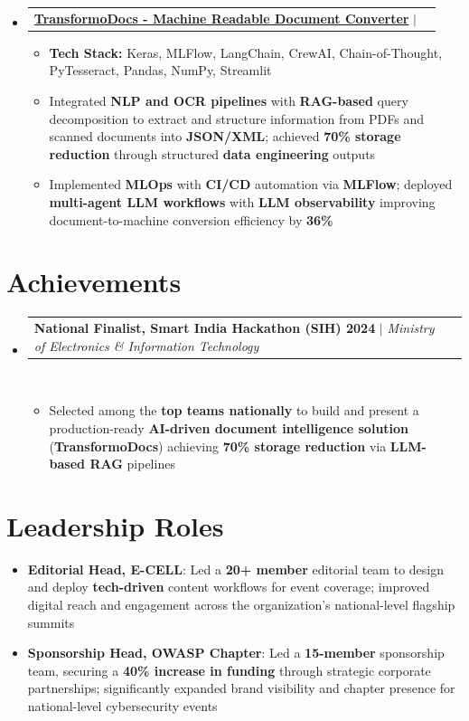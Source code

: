 \documentclass[a4paper, 11pt]{article}
\makeatletter
\newcommand{\resumeItem}[2]{
  \item\small{
    \textbf{#1}{: #2 \vspace{-4pt}}
  }
}
\newcommand{\resumeItemWithoutTitle}[1]{
  \item\small{
    {#1 \vspace{-2pt}}
      {\vspace{-2pt}}
  }
}
\newcommand{\resumeSubheadingPro}[2]{
  \vspace{-2pt}\item
  \begin{tabular*}{0.97\textwidth}{l@{\extracolsep{\fill}}r}
    #1 & {\textit {\small{#2}}} \\
  \end{tabular*}\vspace{-7pt}
}
\newcommand{\resumeSubItem}[2]{\resumeItem{#1}{#2}\vspace{-5pt}}
\newcommand{\resumeSubHeadingListStart}{\begin{itemize}[leftmargin=*,
      label={}]}
\newcommand{\resumeSubHeadingListEnd}{\end{itemize}}
\newcommand{\resumeItemListStart}{\begin{itemize}}
\newcommand{\resumeItemListEnd}{\end{itemize}\vspace{-2pt}}
\makeatother
\begin{document}
\resumeSubHeadingListStart
\resumeSubheadingPro
{\href{https://github.com/AnubhavBhattachayra/TransformoDocs}{{\textbf{TransformoDocs - Machine Readable Document Converter}}} $|$
  \href{https://github.com/AnubhavBhattachayra/TransformoDocs}{\faIcon{github}}}{}
\resumeItemListStart
\resumeItemWithoutTitle
{\textbf{Tech Stack:} Keras, MLFlow, LangChain, CrewAI, Chain-of-Thought, PyTesseract, Pandas, NumPy, Streamlit}
\resumeItemWithoutTitle
{Integrated \textbf{NLP and OCR pipelines} with \textbf{RAG-based} query decomposition to extract and structure information from PDFs and scanned documents into \textbf{JSON/XML}; achieved \textbf{70\% storage reduction} through structured \textbf{data engineering} outputs}
\resumeItemWithoutTitle
{Implemented \textbf{MLOps} with \textbf{CI/CD} automation via \textbf{MLFlow}; deployed \textbf{multi-agent LLM workflows} with \textbf{LLM observability} improving document-to-machine conversion efficiency by \textbf{36\%}}
\resumeItemListEnd
\resumeSubHeadingListEnd

\section{Achievements}
\resumeSubHeadingListStart
    \resumeSubheadingPro
    {{\textbf{National Finalist, Smart India Hackathon (SIH) 2024}} $|$ \emph{Ministry of Electronics \& Information Technology}}{}\
    \vspace{2pt}
    \resumeItemListStart
        \resumeItemWithoutTitle
        {Selected among the \textbf{top teams nationally} to build and present a production-ready \textbf{AI-driven document intelligence solution} (\textbf{TransformoDocs}) achieving \textbf{70\% storage reduction} via \textbf{LLM-based RAG} pipelines}
    \resumeItemListEnd
\resumeSubHeadingListEnd


\section{Leadership Roles}
\vspace{3pt}
\resumeSubHeadingListStart

\resumeSubItem{\textbf{Editorial Head, E-CELL}}{Led a \textbf{20+ member} editorial team to design and deploy \textbf{tech-driven} content workflows for event coverage; improved digital reach and engagement across the organization's national-level flagship summits}
\vspace{4pt}
\resumeSubItem{\textbf{Sponsorship Head, OWASP Chapter}}{Led a \textbf{15-member} sponsorship team, securing a \textbf{40\% increase in funding} through strategic corporate partnerships; significantly expanded brand visibility and chapter presence for national-level cybersecurity events}
\resumeSubHeadingListEnd
\vspace{-5pt}
\end{document}
